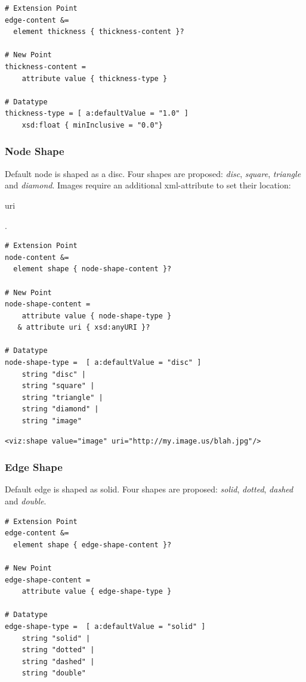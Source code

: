 \documentclass[a4paper,10pt]{article}
\begin{document}
\lstset{ style=rnc }
\begin{lstlisting}[caption={Thickness Specification},label=thicknessRNC]
# Extension Point
edge-content &=
  element thickness { thickness-content }?

# New Point
thickness-content =
    attribute value { thickness-type }

# Datatype
thickness-type = [ a:defaultValue = "1.0" ]
    xsd:float { minInclusive = "0.0"}
\end{lstlisting}

\subsubsection{Node Shape}

Default node is shaped as a disc. Four shapes are proposed: \textit{disc}, \textit{square}, \textit{triangle} and \textit{diamond}. Images require an additional xml-attribute to set their location: \begin{footnotesize}uri\end{footnotesize}.

\lstset{ style=rnc }
\begin{lstlisting}[caption={Node Shape Specification},label=nshapeRNC]
# Extension Point
node-content &=
  element shape { node-shape-content }?

# New Point
node-shape-content =
    attribute value { node-shape-type }
   & attribute uri { xsd:anyURI }?

# Datatype
node-shape-type =  [ a:defaultValue = "disc" ]
    string "disc" |
    string "square" |
    string "triangle" |
    string "diamond" |
    string "image"
\end{lstlisting}

\lstset{ style=gexf }
\begin{lstlisting}[caption={Image Declaration},label=vizimage]
<viz:shape value="image" uri="http://my.image.us/blah.jpg"/>
\end{lstlisting}

\subsubsection{Edge Shape}

Default edge is shaped as solid. Four shapes are proposed: \textit{solid}, \textit{dotted}, \textit{dashed} and \textit{double}.

\lstset{ style=rnc }
\begin{lstlisting}[caption={Edge Shape Specification},label=eshapeRNC]
# Extension Point
edge-content &=
  element shape { edge-shape-content }?

# New Point
edge-shape-content =
    attribute value { edge-shape-type }

# Datatype
edge-shape-type =  [ a:defaultValue = "solid" ]
    string "solid" |
    string "dotted" |
    string "dashed" |
    string "double"
\end{lstlisting}
\end{document}
